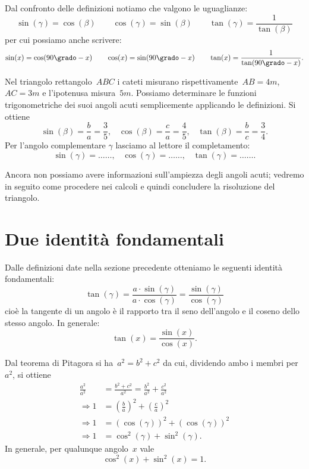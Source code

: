 Dal confronto delle definizioni notiamo che valgono le uguaglianze:
\[\sin(\gamma)=\cos(\beta)\qquad \cos(\gamma)=\sin(\beta)\qquad \tan(\gamma)=\frac{1}{\tan(\beta)}\]
per cui possiamo anche scrivere:
\[\sin(x)=\cos(90\grado-x)\qquad \cos(x)=\sin(90\grado-x)\qquad \tan(x)=\frac{1}{\tan(90\grado-x)}.\]

\begin{exrig}
 \begin{esempio}
Nel triangolo rettangolo~$ABC$ i cateti misurano rispettivamente~$AB=4\unit{m}$, $AC=3\unit{m}$ e l'ipotenusa misura~$5\unit{m}$.
Possiamo determinare le funzioni trigonometriche dei suoi angoli acuti semplicemente applicando le definizioni.
Si ottiene
\[\sin(\beta)=\frac{b}{a}=\frac{3}{5}\text{,}\quad \cos(\beta)=\frac{c}{a}=\frac{4}{5}\text{,}\quad \tan(\beta)=\frac{b}{c}=\frac{3}{4}.\]
Per l'angolo complementare $\gamma$ lasciamo al lettore il completamento:
\[\sin(\gamma)=\ldots\ldots\text{,}\quad \cos(\gamma)=\ldots\ldots\text{,}\quad \tan(\gamma)=\ldots\ldots.\]
 \end{esempio}
\end{exrig}

\osservazione Ancora non possiamo avere informazioni sull'ampiezza degli angoli acuti;
vedremo in seguito come procedere nei calcoli e quindi concludere la risoluzione del triangolo.

\vspace{1.10ex}
\ovalbox{\risolvi \ref{ese:G.1}}

\section{Due identità fondamentali}

Dalle definizioni date nella sezione precedente otteniamo le seguenti identità fondamentali:
\[\tan(\gamma)=\frac{a\cdot \sin(\gamma)}{a\cdot \cos(\gamma)}=\frac{\sin(\gamma)}{\cos(\gamma)}\]
cioè la tangente di un angolo è il rapporto tra il seno dell'angolo e il coseno dello stesso angolo. In generale:
 \begin{equation}
 \label{eq:F.1}
 \tan(x)=\frac{\sin(x)}{\cos(x)}.
 \end{equation}

Dal teorema di Pitagora si ha~$a^{2}=b^{2}+c^{2}$ da cui, dividendo ambo i membri per~$a^{2}$, si ottiene
\begin{align*}
\frac{a^{2}}{a^{2}} &= \frac{b^{2}+c^{2}}{a^{2}}=\frac{b^{2}}{a^{2}}+\frac{c^{2}}{a^{2}}\\
\Rightarrow 1 &= \left(\frac{b}{a}\right)^{2}+\left(\frac{c}{a}\right)^{2}\\
\Rightarrow 1 &= \left(\cos(\gamma)\right)^{2}+\left(\cos (\gamma)\right)^{2}\\
\Rightarrow 1 &= \cos^{2}(\gamma)+\sin^{2}(\gamma).
\end{align*}
In generale, per qualunque angolo~$x$ vale
\begin{equation}
\label{eq:F.2}
 \cos^{2}(x)+\sin^{2}(x)=1.
\end{equation}

